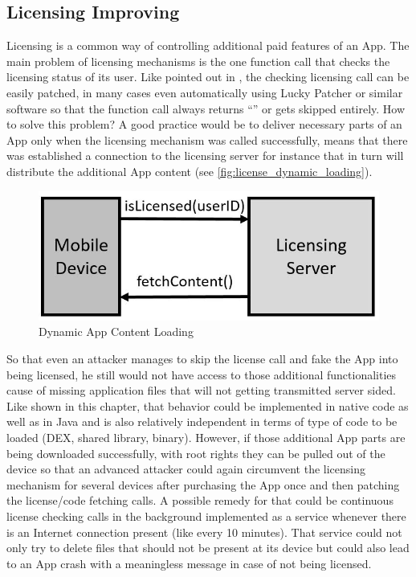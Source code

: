 \subsection{Licensing Improving}
Licensing is a common way of controlling additional paid
features of an App. The main problem of licensing mechanisms is the one
function call that checks the licensing status of its user. Like pointed
out in \parencite{app_sec}, the checking licensing call can be easily
patched, in many cases even automatically using Lucky Patcher or similar
software so that the function call always returns ``''
or gets skipped entirely. How to solve this problem? A good practice would be to deliver necessary parts of an App only when the licensing mechanism was
called successfully, means that there was established a connection to the
licensing server for instance that in turn will distribute the additional
App content (see \autoref{fig:license_dynamic_loading}).
\begin{figure}[htb]
  \centering
  \includegraphics[scale=0.5]{figures/license_dynamic_loading}
  \caption[Dynamic App Content Loading]{Dynamic App Content Loading}
  \label{fig:license_dynamic_loading}
\end{figure}
So that even an attacker manages to skip the license call and fake the App
into being licensed, he still would not have access to those additional
functionalities cause of missing application files that will not getting
transmitted server sided. Like shown in this chapter,
that behavior could be implemented in native code as well as in Java and
is also relatively independent in terms of type of code to be loaded (DEX,
shared library, binary). However, if those additional App parts are being
downloaded successfully, with root rights they can be pulled out of the
device so that an advanced attacker could again circumvent the licensing
mechanism for several devices after purchasing the App once and then patching
the license/code fetching calls.
A possible remedy for that could be continuous license checking calls in the
background implemented as a service whenever there is an Internet connection
present (like every 10 minutes). That service could not only try to delete
files that should not be present at its device but could also lead to an
App crash with a meaningless message in case of not being licensed.

